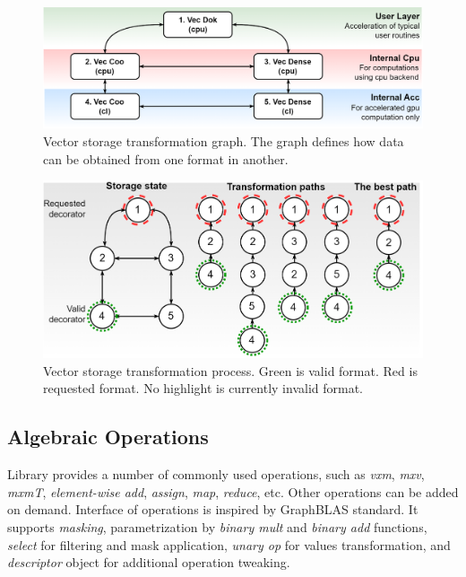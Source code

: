 \begin{figure}[]
\centering
\includegraphics[width=0.95\linewidth]{figures/storage_transformation_graph.png}
\caption{Vector storage transformation graph. The graph defines how data can be obtained from one format in another.}
\label{fig:vec_tsf}
\end{figure}

\begin{figure}[]
\centering
\includegraphics[width=0.95\linewidth]{figures/storage_transformation.png}
\caption{Vector storage transformation process. Green is valid format. Red is requested format. No highlight is currently invalid format.}
\label{fig:vec_exmp}
\end{figure}

\subsection{Algebraic Operations}

Library provides a number of commonly used operations, such as \textit{vxm}, \textit{mxv}, \textit{mxmT}, \textit{element-wise add}, \textit{assign}, \textit{map}, \textit{reduce}, etc.
Other operations can be added on demand.
Interface of operations is inspired by GraphBLAS standard. 
It supports \textit{masking}, parametrization by \textit{binary mult} and \textit{binary add} functions, \textit{select} for filtering and mask application, \textit{unary op} for values transformation, and \textit{descriptor} object for additional operation tweaking.

